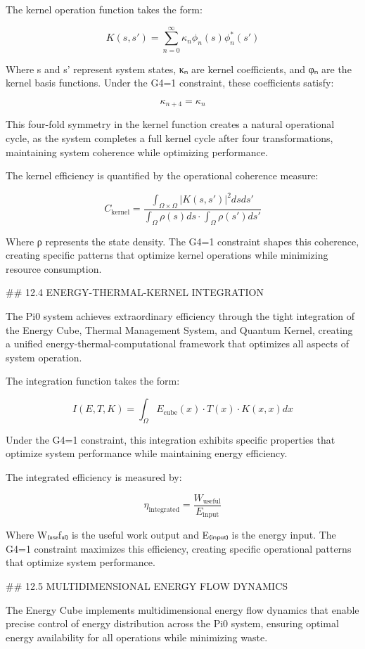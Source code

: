 The kernel operation function takes the form:

$$K(s, s') = \sum_{n=0}^{\infty} \kappa_n \phi_n(s) \phi_n^*(s')$$

Where s and s' represent system states, κₙ are kernel coefficients, and φₙ are the kernel basis functions. Under the G4=1 constraint, these coefficients satisfy:

$$\kappa_{n+4} = \kappa_n$$

This four-fold symmetry in the kernel function creates a natural operational cycle, as the system completes a full kernel cycle after four transformations, maintaining system coherence while optimizing performance.

The kernel efficiency is quantified by the operational coherence measure:

$$C_{\text{kernel}} = \frac{\int_{\Omega \times \Omega} |K(s, s')|^2 ds ds'}{\int_{\Omega} \rho(s) ds \cdot \int_{\Omega} \rho(s') ds'}$$

Where ρ represents the state density. The G4=1 constraint shapes this coherence, creating specific patterns that optimize kernel operations while minimizing resource consumption.

## 12.4 ENERGY-THERMAL-KERNEL INTEGRATION

The Pi0 system achieves extraordinary efficiency through the tight integration of the Energy Cube, Thermal Management System, and Quantum Kernel, creating a unified energy-thermal-computational framework that optimizes all aspects of system operation.

The integration function takes the form:

$$I(E, T, K) = \int_{\Omega} E_{\text{cube}}(x) \cdot T(x) \cdot K(x, x) dx$$

Under the G4=1 constraint, this integration exhibits specific properties that optimize system performance while maintaining energy efficiency.

The integrated efficiency is measured by:

$$\eta_{\text{integrated}} = \frac{W_{\text{useful}}}{E_{\text{input}}}$$

Where W₍ᵤₛₑfᵤₗ₎ is the useful work output and E₍ᵢₙₚᵤₜ₎ is the energy input. The G4=1 constraint maximizes this efficiency, creating specific operational patterns that optimize system performance.

## 12.5 MULTIDIMENSIONAL ENERGY FLOW DYNAMICS

The Energy Cube implements multidimensional energy flow dynamics that enable precise control of energy distribution across the Pi0 system, ensuring optimal energy availability for all operations while minimizing waste.


